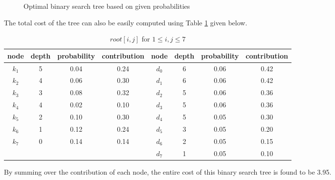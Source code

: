 \begin{figure}[H]\centering
{}
\caption{Optimal binary search tree based on given probabilities}\label{fig51}
\end{figure}

The total cost of the tree can also be easily computed using Table \ref{tab55} given below.

\begin{table}[H]\centering
\begin{tabular}{c c c c | c c c c}
node & depth & probability & contribution & node & depth & probability & contribution\\\hline
$k_1$ & 5 & 0.04 & 0.24 & $d_0$ & 6 & 0.06 & 0.42\\
$k_2$ & 4 & 0.06 & 0.30 & $d_1$ & 6 & 0.06 & 0.42\\
$k_3$ & 3 & 0.08 & 0.32 & $d_2$ & 5 & 0.06 & 0.36\\
$k_4$ & 4 & 0.02 & 0.10 & $d_3$ & 5 & 0.06 & 0.36\\
$k_5$ & 2 & 0.10 & 0.30 & $d_4$ & 5 & 0.05 & 0.30\\
$k_6$ & 1 & 0.12 & 0.24 & $d_5$ & 3 & 0.05 & 0.20\\
$k_7$ & 0 & 0.14 & 0.14 & $d_6$ & 2 & 0.05 & 0.15\\
      &   &      &      & $d_7$ & 1 & 0.05 & 0.10\\\hline
\end{tabular}
\caption{$root[i,j]$ for $1 \leq i,j \leq 7$}\label{tab55}
\end{table}

By summing over the contribution of each node, the entire cost of this binary search tree is found to be 3.95.
